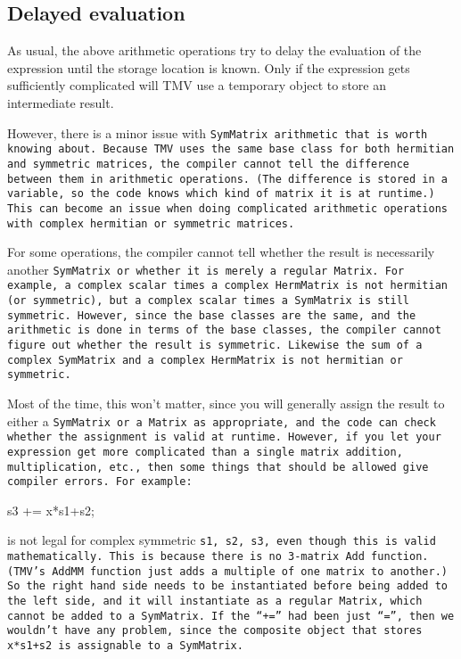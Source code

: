 \subsection{Delayed evaluation}

As usual, the above arithmetic operations try to delay the evaluation 
of the expression until the storage location is known.  Only if the 
expression gets sufficiently complicated will TMV use a temporary
object to store an intermediate result.

However, there is a minor issue with \tt{SymMatrix} arithmetic that is
worth knowing about.
Because TMV uses the same base class for both hermitian and symmetric
matrices, the compiler cannot tell the difference between them in arithmetic
operations.  (The difference is stored in a variable, so the code knows which kind of matrix it is at runtime.)
This can become an issue when doing complicated arithmetic operations
with complex hermitian or symmetric matrices.

For some operations, the compiler cannot tell whether the result is
necessarily another \tt{SymMatrix} or whether it is merely a regular
\tt{Matrix}.
For example, a complex scalar times a complex \tt{HermMatrix} is not 
hermitian (or symmetric), but a complex scalar times a \tt{SymMatrix}
is still symmetric.  However, since the base classes are the same, and the 
arithmetic is done in terms of the base classes, the compiler cannot
figure out whether the result is symmetric.
Likewise the sum of a complex \tt{SymMatrix} and a complex \tt{HermMatrix} is not hermitian or symmetric.

Most of the time, this won't matter, since
you will generally assign the result to either a \tt{SymMatrix} or a \tt{Matrix}
as appropriate, and the code can check whether the assignment is valid at runtime.  
However, if you let your expression get more complicated than a single
matrix addition, multiplication, etc., then some things that should be allowed give compiler errors.
For example:
\begin{tmvcode}
s3 += x*s1+s2;
\end{tmvcode}
is not legal for complex symmetric \tt{s1, s2, s3}, even though this is valid mathematically.
This is because there is no 3-matrix 
\tt{Add} function.  (TMV's \tt{AddMM} function just adds a multiple of one 
matrix to another.)  So the right hand side needs to be instantiated before
being added to the left side, and it will instantiate as a regular \tt{Matrix},
which cannot be added to a \tt{SymMatrix}.  
If the ``\tt{+=}'' had been just ``\tt{=}'', then we wouldn't have any problem,
since the composite object that stores \tt{x*s1+s2} is assignable to a \tt{SymMatrix}.

